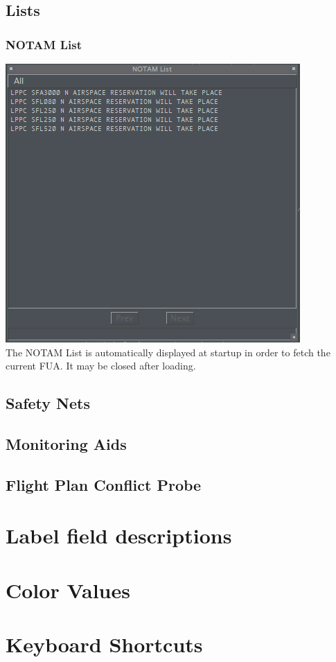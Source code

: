 \documentclass[11pt,a4paper,oldfontcommands]{memoir}
\begin{document}
\section{Lists}

\subsection{NOTAM List}
\label{list:notam}
\includegraphics{img/notamlist.png}\\
The NOTAM List is automatically displayed at startup in order to fetch the current FUA. It may be closed after loading.\\

\section{Safety Nets}

\section{Monitoring Aids}

\section{Flight Plan Conflict Probe}

\appendix

\chapter{Label field descriptions}

\chapter{Color Values}

\chapter{Keyboard Shortcuts}



\end{document}
